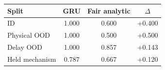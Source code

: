 \begin{tabular}{lccc}
\toprule
Split & GRU & Fair analytic & $\Delta$ \\
\midrule
ID & 1.000 & 0.600 & +0.400 \\
Physical OOD & 1.000 & 0.500 & +0.500 \\
Delay OOD & 1.000 & 0.857 & +0.143 \\
Held mechanism & 0.787 & 0.667 & +0.120 \\
\bottomrule
\end{tabular}
